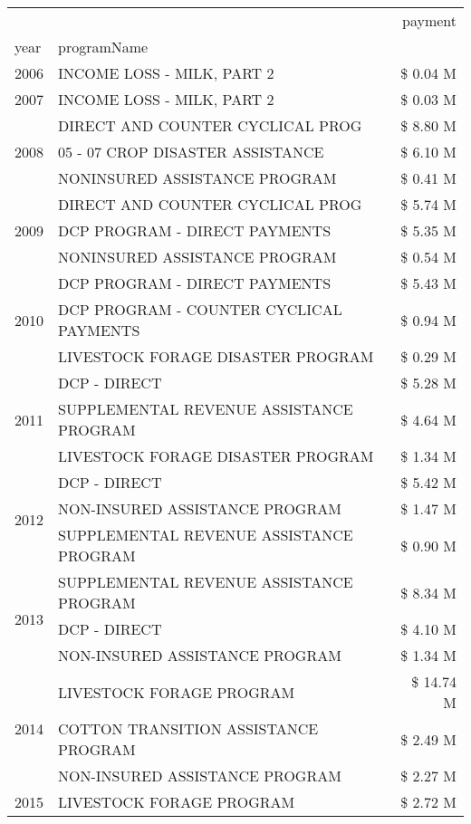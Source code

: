 \begin{tabular}{llr}
\toprule
 &  & payment \\
year & programName &  \\
\midrule
2006 & INCOME LOSS - MILK, PART 2 & \$ 0.04 M \\
\cline{1-3}
2007 & INCOME LOSS - MILK, PART 2 & \$ 0.03 M \\
\cline{1-3}
\multirow[t]{3}{*}{2008} & DIRECT AND COUNTER CYCLICAL PROG & \$ 8.80 M \\
 & 05 - 07 CROP DISASTER ASSISTANCE & \$ 6.10 M \\
 & NONINSURED ASSISTANCE PROGRAM & \$ 0.41 M \\
\cline{1-3}
\multirow[t]{3}{*}{2009} & DIRECT AND COUNTER CYCLICAL PROG & \$ 5.74 M \\
 & DCP PROGRAM - DIRECT PAYMENTS & \$ 5.35 M \\
 & NONINSURED ASSISTANCE PROGRAM & \$ 0.54 M \\
\cline{1-3}
\multirow[t]{3}{*}{2010} & DCP PROGRAM - DIRECT PAYMENTS & \$ 5.43 M \\
 & DCP PROGRAM - COUNTER CYCLICAL PAYMENTS & \$ 0.94 M \\
 & LIVESTOCK FORAGE DISASTER  PROGRAM & \$ 0.29 M \\
\cline{1-3}
\multirow[t]{3}{*}{2011} & DCP - DIRECT & \$ 5.28 M \\
 & SUPPLEMENTAL REVENUE ASSISTANCE PROGRAM & \$ 4.64 M \\
 & LIVESTOCK FORAGE DISASTER PROGRAM & \$ 1.34 M \\
\cline{1-3}
\multirow[t]{3}{*}{2012} & DCP - DIRECT & \$ 5.42 M \\
 & NON-INSURED ASSISTANCE PROGRAM & \$ 1.47 M \\
 & SUPPLEMENTAL REVENUE ASSISTANCE PROGRAM & \$ 0.90 M \\
\cline{1-3}
\multirow[t]{3}{*}{2013} & SUPPLEMENTAL REVENUE ASSISTANCE PROGRAM & \$ 8.34 M \\
 & DCP - DIRECT & \$ 4.10 M \\
 & NON-INSURED ASSISTANCE PROGRAM & \$ 1.34 M \\
\cline{1-3}
\multirow[t]{3}{*}{2014} & LIVESTOCK FORAGE PROGRAM & \$ 14.74 M \\
 & COTTON TRANSITION ASSISTANCE PROGRAM & \$ 2.49 M \\
 & NON-INSURED ASSISTANCE PROGRAM & \$ 2.27 M \\
\cline{1-3}
\multirow[t]{3}{*}{2015} & LIVESTOCK FORAGE PROGRAM & \$ 2.72 M \\

\end{tabular}
